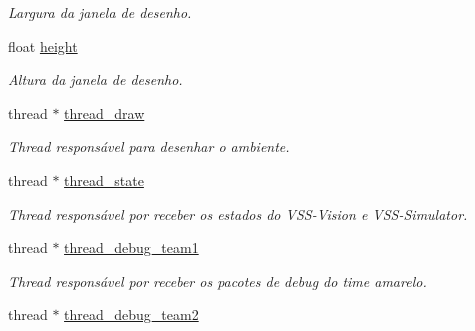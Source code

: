 \begin{DoxyCompactItemize}
\begin{DoxyCompactList}\small\item\em Largura da janela de desenho. \end{DoxyCompactList}\item 
float \hyperlink{classGraphics_a47cbc0011a0a10476fec75d62d7e0fcf}{height}\hypertarget{classGraphics_a47cbc0011a0a10476fec75d62d7e0fcf}{}\label{classGraphics_a47cbc0011a0a10476fec75d62d7e0fcf}

\begin{DoxyCompactList}\small\item\em Altura da janela de desenho. \end{DoxyCompactList}\item 
thread $\ast$ \hyperlink{classGraphics_ac8094b0bd8b0962735f5fdebb7b70f53}{thread\+\_\+draw}\hypertarget{classGraphics_ac8094b0bd8b0962735f5fdebb7b70f53}{}\label{classGraphics_ac8094b0bd8b0962735f5fdebb7b70f53}

\begin{DoxyCompactList}\small\item\em Thread responsável para desenhar o ambiente. \end{DoxyCompactList}\item 
thread $\ast$ \hyperlink{classGraphics_a202be3ede52a05610cdd075e018e69ae}{thread\+\_\+state}\hypertarget{classGraphics_a202be3ede52a05610cdd075e018e69ae}{}\label{classGraphics_a202be3ede52a05610cdd075e018e69ae}

\begin{DoxyCompactList}\small\item\em Thread responsável por receber os estados do V\+S\+S-\/\+Vision e V\+S\+S-\/\+Simulator. \end{DoxyCompactList}\item 
thread $\ast$ \hyperlink{classGraphics_a291d3fb993aaf96ffe574ce850ef147f}{thread\+\_\+debug\+\_\+team1}\hypertarget{classGraphics_a291d3fb993aaf96ffe574ce850ef147f}{}\label{classGraphics_a291d3fb993aaf96ffe574ce850ef147f}

\begin{DoxyCompactList}\small\item\em Thread responsável por receber os pacotes de debug do time amarelo. \end{DoxyCompactList}\item 
thread $\ast$ \hyperlink{classGraphics_af5011e9e4e9a8eddbf1d1a75156c8f7e}{thread\+\_\+debug\+\_\+team2}\hypertarget{classGraphics_af5011e9e4e9a8eddbf1d1a75156c8f7e}{}\label{classGraphics_af5011e9e4e9a8eddbf1d1a75156c8f7e}


\end{DoxyCompactItemize}
